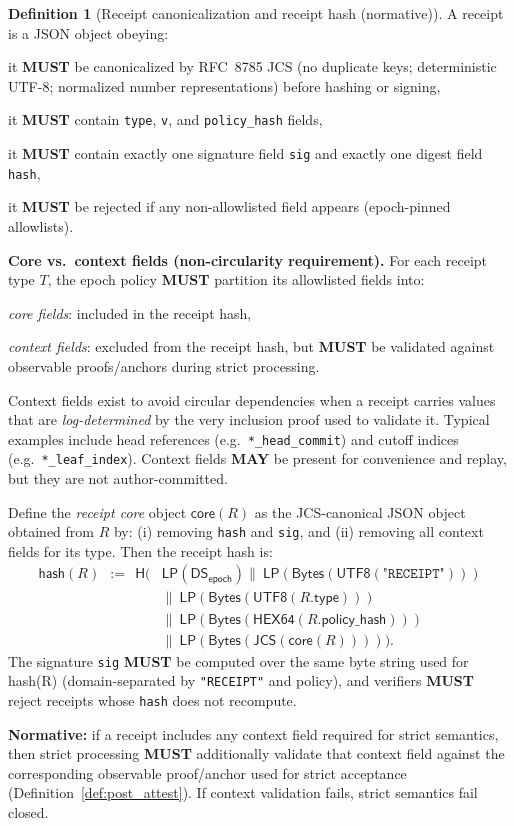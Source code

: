 \documentclass[11pt]{article}
\newcommand{\MUST}{\textbf{MUST}}
\newcommand{\MAY}{\textbf{MAY}}
\newcommand{\code}[1]{\texttt{#1}}
\newcommand{\1}{\mathbf{1}}
\newcommand{\Hash}{\mathsf{H}}
\newcommand{\DS}{\mathsf{DS}}
\newcommand{\LP}{\mathsf{LP}}
\theoremstyle{definition}
\newtheorem{definition}{Definition}
\theoremstyle{plain}
\begin{document}
\begin{definition}[Receipt canonicalization and receipt hash (normative)]
\label{def:rcpt_hash}
A receipt is a JSON object obeying:
\begin{tightitemize}
\item it \MUST{} be canonicalized by RFC~8785 JCS (no duplicate keys; deterministic UTF-8; normalized number representations) before hashing or signing,
\item it \MUST{} contain \code{type}, \code{v}, and \code{policy\_hash} fields,
\item it \MUST{} contain exactly one signature field \code{sig} and exactly one digest field \code{hash},
\item it \MUST{} be rejected if any non-allowlisted field appears (epoch-pinned allowlists).
\end{tightitemize}

\textbf{Core vs.\ context fields (non-circularity requirement).}
For each receipt type $T$, the epoch policy \MUST{} partition its allowlisted fields into:
\begin{tightitemize}
\item \emph{core fields}: included in the receipt hash,
\item \emph{context fields}: excluded from the receipt hash, but \MUST{} be validated against observable proofs/anchors during strict processing.
\end{tightitemize}
Context fields exist to avoid circular dependencies when a receipt carries values that are \emph{log-determined} by the very inclusion proof used to validate it. Typical examples include head references (e.g.\ \code{*\_head\_commit}) and cutoff indices (e.g.\ \code{*\_leaf\_index}). Context fields \MAY{} be present for convenience and replay, but they are not author-committed.

Define the \emph{receipt core} object $\textsf{core}(R)$ as the JCS-canonical JSON object obtained from $R$ by:
(i) removing \code{hash} and \code{sig}, and
(ii) removing all context fields for its type.
Then the receipt hash is:
\begin{align*}
\textsf{hash}(R)\ \ :=\ \ \Hash\!\big(
  &\LP(\DS_{\textsf{epoch}})
  \|\ \LP(\mathsf{Bytes}(\textsf{UTF8}(\texttt{"RECEIPT"})))\\
  &\|\ \LP(\mathsf{Bytes}(\textsf{UTF8}(R.\textsf{type})))\\
  &\|\ \LP(\mathsf{Bytes}(\textsf{HEX64}(R.\textsf{policy\_hash})))\\
  &\|\ \LP(\mathsf{Bytes}(\textsf{JCS}(\textsf{core}(R))))
\big).
\end{align*}
The signature \code{sig} \MUST{} be computed over the same byte string used for \textsf{hash}(R) (domain-separated by \texttt{"RECEIPT"} and policy), and verifiers \MUST{} reject receipts whose \code{hash} does not recompute.

\textbf{Normative:} if a receipt includes any context field required for strict semantics, then strict processing \MUST{} additionally validate that context field against the corresponding observable proof/anchor used for strict acceptance (Definition~\ref{def:post_attest}). If context validation fails, strict semantics fail closed.
\end{definition}
\end{document}
